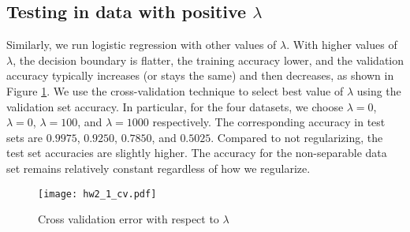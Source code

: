 \subsection{Testing in data with positive $\lambda$}
Similarly, we run logistic regression with other values of $\lambda$. With higher values of $\lambda$, the decision boundary is flatter, the training accuracy lower, and the validation accuracy typically increases (or stays the same) and then decreases, as shown in Figure \ref{fig:LR_cv}. We use the cross-validation technique to select best value of $\lambda$ using the validation set accuracy. In particular, for the four datasets, we choose $\lambda = 0$, $\lambda = 0$, $\lambda = 100$, and $\lambda = 1000$ respectively. The corresponding accuracy in test sets are $0.9975$, $0.9250$, $0.7850$, and $0.5025$. Compared to not regularizing, the test set accuracies are slightly higher. The accuracy for the non-separable data set remains relatively constant regardless of how we regularize. 
\begin{figure}[hb]
\centering
	\texttt{[image: hw2\_1\_cv.pdf]}
	\caption{Cross validation error with respect to $\lambda$}\label{fig:LR_cv}
\end{figure}
	